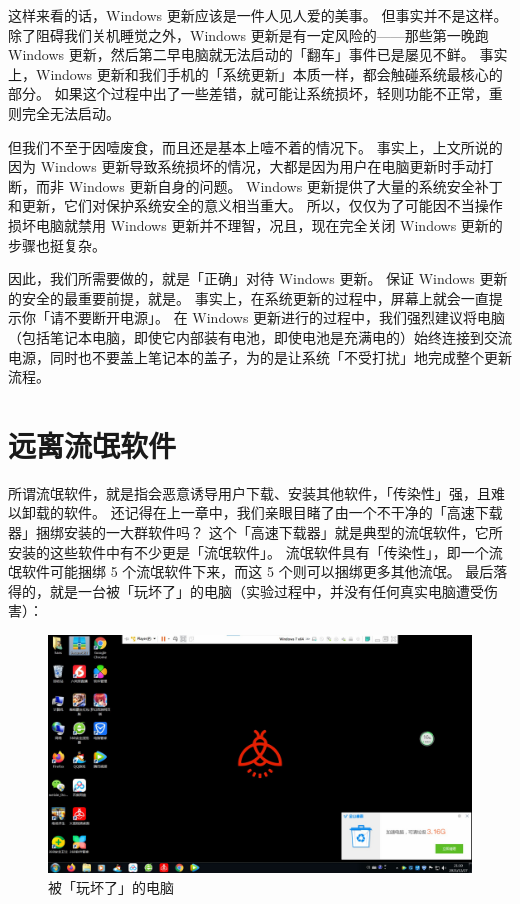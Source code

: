 这样来看的话，Windows 更新应该是一件人见人爱的美事。
但事实并不是这样。
除了阻碍我们关机睡觉之外，Windows 更新是有一定风险的——那些第一晚跑 Windows 更新，然后第二早电脑就无法启动的「翻车」事件已是屡见不鲜。
事实上，Windows 更新和我们手机的「系统更新」本质一样，都会触碰系统最核心的部分。
如果这个过程中出了一些差错，就可能让系统损坏，轻则功能不正常，重则完全无法启动。

但我们不至于因噎废食，而且还是基本上噎不着的情况下。
事实上，上文所说的因为 Windows 更新导致系统损坏的情况，大都是因为用户在电脑更新时手动打断，而非 Windows 更新自身的问题。
Windows 更新提供了大量的系统安全补丁和更新，它们对保护系统安全的意义相当重大。
所以，仅仅为了可能因不当操作损坏电脑就禁用 Windows 更新并不理智，况且，现在完全关闭 Windows 更新的步骤也挺复杂。

因此，我们所需要做的，就是「正确」对待 Windows 更新。
保证 Windows 更新的安全的最重要前提，就是。
事实上，在系统更新的过程中，屏幕上就会一直提示你「请不要断开电源」。
在 Windows 更新进行的过程中，我们强烈建议将电脑（包括笔记本电脑，即使它内部装有电池，即使电池是充满电的）始终连接到交流电源，同时也不要盖上笔记本的盖子，为的是让系统「不受打扰」地完成整个更新流程。

\section{远离流氓软件}

所谓流氓软件，就是指会恶意诱导用户下载、安装其他软件，「传染性」强，且难以卸载的软件。
还记得在上一章中，我们亲眼目睹了由一个不干净的「高速下载器」捆绑安装的一大群软件吗？
这个「高速下载器」就是典型的流氓软件，它所安装的这些软件中有不少更是「流氓软件」。
流氓软件具有「传染性」，即一个流氓软件可能捆绑 5 个流氓软件下来，而这 5 个则可以捆绑更多其他流氓。
最后落得的，就是一台被「玩坏了」的电脑（实验过程中，并没有任何真实电脑遭受伤害）：

\begin{figure}[htb!]
  \centering
  \includegraphics[width=12cm]{assets/Computer_In_A_Mess.jpg}
  \caption{被「玩坏了」的电脑}
  \label{Computer_In_A_Mess}
\end{figure}

